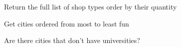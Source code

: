 \documentclass[14pt]{extreport}
\begin{document}
\newpage

Return the full list of shop types order by their quantity
\newline
\begin{center}
  \end{center}
\centering 

\newpage

Get cities ordered from most to least fun
\newline
\begin{center}
  \end{center}
\centering 

\newpage

Are there cities that don't have universities?
\newline
\begin{center}
  \end{center}
\centering 
\end{document}
